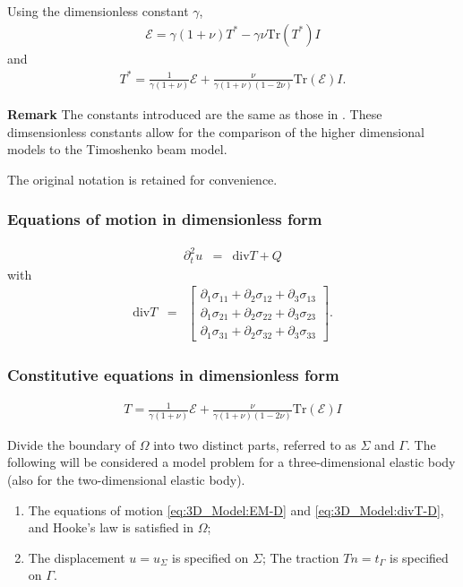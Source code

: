 			Using the dimensionless constant $\gamma$,
			\begin{eqnarray}
				\mathcal{E} = \gamma(1+\nu)T^* - \gamma\nu \textrm{Tr}(T^*)I \label{DM_H_E}
			\end{eqnarray}
			and
			\begin{eqnarray}
				T^* = \frac{1}{\gamma(1+\nu)}\mathcal{E} + \frac{\nu}{\gamma(1+\nu)(1-2\nu)}\textrm{Tr}(\mathcal{E})I. \label{DM_H_T}
			\end{eqnarray}

			\textbf{Remark} The constants introduced are the same as those in \cite{LVV09}.
			These dimsensionless constants allow for the comparison of the higher dimensional models to the Timoshenko beam model.

			The original notation is retained for convenience.

		\subsubsection*{Equations of motion in dimensionless form}\label{sssec:3D_Model:EquationOfMotionDimensionless}
			\begin{eqnarray}
				\partial_t^2 u & = & \textrm{div}T + Q \label{eq:3D_Model:EM-D}
			\end{eqnarray}
			with
			\begin{eqnarray}
				\textrm{div}  T & = &
				\begin{bmatrix}
					\partial_1 \sigma_{11} + \partial_2 \sigma_{12} + \partial_3 \sigma_{13} \\
					\partial_1 \sigma_{21} + \partial_2 \sigma_{22} + \partial_3 \sigma_{23} \\
					\partial_1 \sigma_{31} + \partial_2 \sigma_{32} + \partial_3 \sigma_{33}
				\end{bmatrix}.\label{eq:3D_Model:divT-D}
			\end{eqnarray}

		\subsubsection*{Constitutive equations in dimensionless form}\label{sssec:3D_Model:ConstitutiveEquationsDimensionless}
			\begin{eqnarray}
				T = \frac{1}{\gamma(1+\nu)} \mathcal{E} + \frac{\nu}{\gamma(1+\nu)(1-2\nu)}\textrm{Tr}(\mathcal{E})I \label{eq:3D_Model:CE-D}
			\end{eqnarray}

		Divide the boundary of $\Omega$ into two distinct parts, referred to as $\Sigma$ and $\Gamma$. The following will be considered a model problem for a three-dimensional elastic body (also for the two-dimensional elastic body).
		\begin{enumerate}
			\item[] The equations of motion \eqref{eq:3D_Model:EM-D} and \eqref{eq:3D_Model:divT-D}, and Hooke's law is satisfied in $\Omega$;
			\item[] The displacement $u = u_\Sigma$ is specified on
				$\Sigma$; The traction $Tn = t_\Gamma$ is specified on
				$\Gamma$.
		\end{enumerate} \label{sym:n}\label{sym:SigmaGamma}

